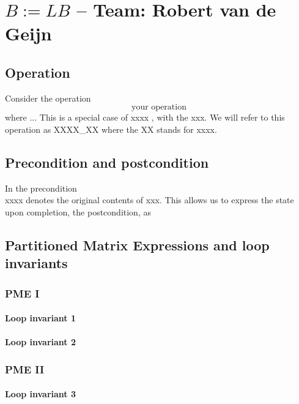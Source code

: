 \chapter{$ B := L B $ --  \large Team: Robert van de Geijn}



\section{Operation}

Consider the operation
\[
\mbox{your operation}
\]
where ...
This is a special case of xxxx , 
with the xxx.
We will refer to this operation
as {\sc XXXX\_XX} where the {\sc XX} stands for
xxxx.


\section{Precondition and postcondition}

In the precondition 
\[
\]
xxxx denotes the original contents of xxx.
This allows us to express the state upon completion, the postcondition, as
\[
\]

\section{Partitioned Matrix Expressions and loop invariants}



\subsection{PME I}

\subsubsection{Loop invariant 1}


\subsubsection{Loop invariant 2}

\subsection{PME II}

\subsubsection{Loop invariant 3}